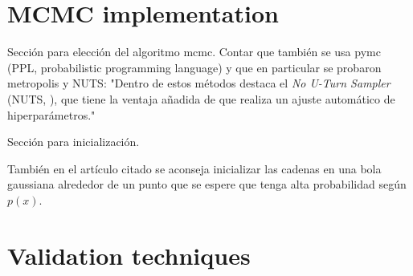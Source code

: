 \section{MCMC implementation}

\begin{outcomment}
  Sección para elección del algoritmo mcmc. Contar que también se usa pymc (PPL, probabilistic programming language) y que en particular se probaron metropolis y NUTS: "Dentro de estos métodos destaca el \textit{No U-Turn Sampler} (NUTS, \citet{hoffman2014no}), que tiene la ventaja añadida de que realiza un ajuste automático de hiperparámetros."

\end{outcomment}

\begin{outcomment}
  Sección para inicialización.

  También en el artículo citado se aconseja inicializar las cadenas en una bola gaussiana alrededor de un punto que se espere que tenga alta probabilidad según \(p(x)\).
\end{outcomment}

\section{Validation techniques}

